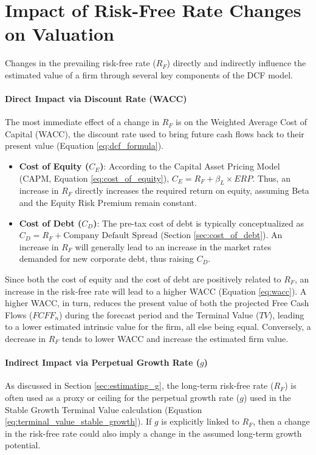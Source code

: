 \section{Impact of Risk-Free Rate Changes on Valuation}

Changes in the prevailing risk-free rate (\(R_F\)) directly and indirectly influence the estimated value of a firm through several key components of the DCF model.

\paragraph{Direct Impact via Discount Rate (WACC)}
The most immediate effect of a change in \(R_F\) is on the Weighted Average Cost of Capital (WACC), the discount rate used to bring future cash flows back to their present value (Equation \ref{eq:dcf_formula}).
\begin{itemize}
    \item \textbf{Cost of Equity (\(C_E\))}: According to the Capital Asset Pricing Model (CAPM, Equation \ref{eq:cost_of_equity}), \(C_E = R_F + \beta_L \times ERP\). Thus, an increase in \(R_F\) directly increases the required return on equity, assuming Beta and the Equity Risk Premium remain constant.
    \item \textbf{Cost of Debt (\(C_D\))}: The pre-tax cost of debt is typically conceptualized as \(C_D = R_F + \text{Company Default Spread}\) (Section \ref{sec:cost_of_debt}). An increase in \(R_F\) will generally lead to an increase in the market rates demanded for new corporate debt, thus raising \(C_D\).
\end{itemize}

Since both the cost of equity and the cost of debt are positively related to \(R_F\), an increase in the risk-free rate will lead to a higher WACC (Equation \ref{eq:wacc}). A higher WACC, in turn, reduces the present value of both the projected Free Cash Flows (\(FCFF_n\)) during the forecast period and the Terminal Value (\(TV\)), leading to a lower estimated intrinsic value for the firm, all else being equal. Conversely, a decrease in \(R_F\) tends to lower WACC and increase the estimated firm value.

\paragraph{Indirect Impact via Perpetual Growth Rate (\(g\))}
As discussed in Section \ref{sec:estimating_g}, the long-term risk-free rate (\(R_F\)) is often used as a proxy or ceiling for the perpetual growth rate (\(g\)) used in the Stable Growth Terminal Value calculation (Equation \ref{eq:terminal_value_stable_growth}). If \(g\) is explicitly linked to \(R_F\), then a change in the risk-free rate could also imply a change in the assumed long-term growth potential.


